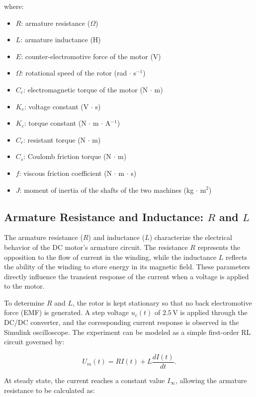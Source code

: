 \documentclass{rapportCS}
\begin{document}
\noindent where:
\begin{itemize}
    \item $R$: armature resistance ($\Omega$)
    \item $L$: armature inductance (H)
    \item $E$: counter-electromotive force of the motor (V)
    \item $\Omega$: rotational speed of the rotor (rad $\cdot$ s$^{-1}$)
    \item $C_e$: electromagnetic torque of the motor (N $\cdot$ m)
    \item $K_e$: voltage constant (V $\cdot$ s)
    \item $K_c$: torque constant (N $\cdot$ m $\cdot$ A$^{-1}$)
    \item $C_r$: resistant torque (N $\cdot$ m)
    \item $C_s$: Coulomb friction torque (N $\cdot$ m)
    \item $f$: viscous friction coefficient (N $\cdot$ m $\cdot$ s)
    \item $J$: moment of inertia of the shafts of the two machines (kg $\cdot$ m$^2$)
\end{itemize}

\subsection{Armature Resistance and Inductance: $R$ and $L$}

The armature resistance ($R$) and inductance ($L$) characterize the electrical behavior of the DC motor’s armature circuit. The resistance $R$ represents the opposition to the flow of current in the winding, while the inductance $L$ reflects the ability of the winding to store energy in its magnetic field. These parameters directly influence the transient response of the current when a voltage is applied to the motor.

To determine $R$ and $L$, the rotor is kept stationary so that no back electromotive force (EMF) is generated. A step voltage $u_c(t)$ of $2.5\,\mathrm{V}$ is applied through the DC/DC converter, and the corresponding current response is observed in the Simulink oscilloscope. The experiment can be modeled as a simple first-order RL circuit governed by:

\[
U_m(t) = R I(t) + L \frac{dI(t)}{dt}.
\]

At steady state, the current reaches a constant value $I_\infty$, allowing the armature resistance to be calculated as:
\end{document}
